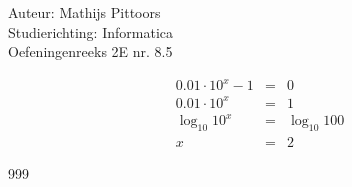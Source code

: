 \documentclass[a4paper]{article}
\begin{document}
  
\noindent \large Auteur: Mathijs Pittoors \\
\noindent \large Studierichting: Informatica\\
\noindent \large Oefeningenreeks 2E nr. 8.5\\

\medskip

\normalsize

\begin{eqnarray*}
    0.01 \cdot 10^x - 1 &=& 0\\
    0.01 \cdot 10^x &=& 1\\
    \log_{10} 10^x &=& \log_{10} 100\\
    x &=& 2
\end{eqnarray*}


\begin{thebibliography}{999}
\end{thebibliography}
\end{document}
